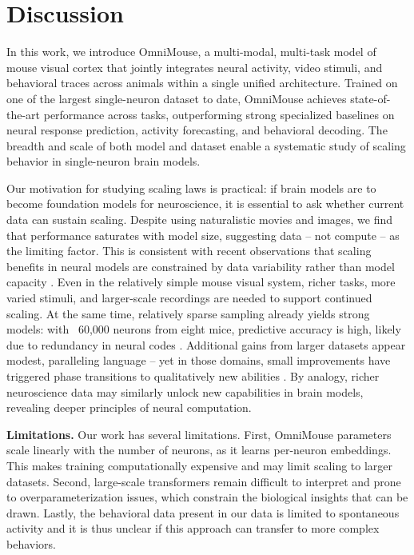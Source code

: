 \documentclass{article} %
\begin{document}
\section{Discussion}
In this work, we introduce OmniMouse, a multi-modal, multi-task model of mouse visual cortex that jointly integrates neural activity, video stimuli, and behavioral traces across animals within a single unified architecture. Trained on one of the largest single-neuron dataset to date, OmniMouse achieves state-of-the-art performance across tasks, outperforming strong specialized baselines on neural response prediction, activity forecasting, and behavioral decoding. The breadth and scale of both model and dataset enable a systematic study of scaling behavior in single-neuron brain models.

Our motivation for studying scaling laws is practical: if brain models are to become foundation models for neuroscience, it is essential to ask whether current data can sustain scaling. Despite using naturalistic movies and images, we find that performance saturates with model size, suggesting data -- not compute -- as the limiting factor. This is consistent with recent observations that scaling benefits in neural models are constrained by data variability rather than model capacity \citep{jiang2025data, ye2025generalist, gokce2024scaling}. Even in the relatively simple mouse visual system, richer tasks, more varied stimuli, and larger-scale recordings are needed to support continued scaling. At the same time, relatively sparse sampling already yields strong models: with ~60,000 neurons from eight mice, predictive accuracy is high, likely due to redundancy in neural codes \citep{stringer2019spontaneous}. Additional gains from larger datasets appear modest, paralleling language \citep{kaplan2020scaling, hoffmann2022training} -- yet in those domains, small improvements have triggered phase transitions to qualitatively new abilities \citep{Wei2022-fa}. By analogy, richer neuroscience data may similarly unlock new capabilities in brain models, revealing deeper principles of neural computation.



\textbf{Limitations.} 
Our work has several limitations. First, OmniMouse parameters scale linearly with the number of neurons, as it learns per-neuron embeddings. 
This makes training computationally expensive and may limit scaling to larger datasets. 
Second, large-scale transformers remain difficult to interpret and prone to overparameterization issues, which constrain the biological insights that can be drawn. Lastly, the behavioral data present in our data is limited to spontaneous activity and it is thus unclear if this approach can transfer to more complex behaviors.
\end{document}
